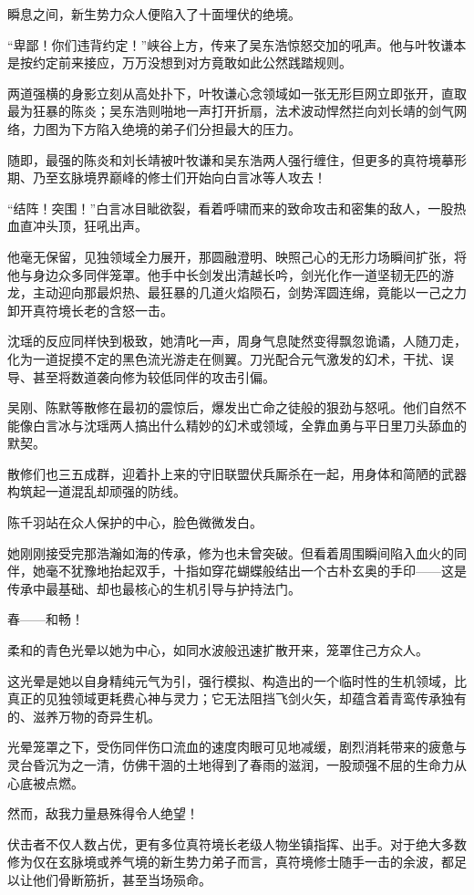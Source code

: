 瞬息之间，新生势力众人便陷入了十面埋伏的绝境。

“卑鄙！你们违背约定！”峡谷上方，传来了吴东浩惊怒交加的吼声。他与叶牧谦本是按约定前来接应，万万没想到对方竟敢如此公然践踏规则。

两道强横的身影立刻从高处扑下，叶牧谦心念领域如一张无形巨网立即张开，直取最为狂暴的陈炎；吴东浩则啪地一声打开折扇，法术波动悍然拦向刘长靖的剑气网络，力图为下方陷入绝境的弟子们分担最大的压力。

随即，最强的陈炎和刘长靖被叶牧谦和吴东浩两人强行缠住，但更多的真符境摹形期、乃至玄脉境界巅峰的修士们开始向白言冰等人攻去！

“结阵！突围！”白言冰目眦欲裂，看着呼啸而来的致命攻击和密集的敌人，一股热血直冲头顶，狂吼出声。

他毫无保留，见独领域全力展开，那圆融澄明、映照己心的无形力场瞬间扩张，将他与身边众多同伴笼罩。他手中长剑发出清越长吟，剑光化作一道坚韧无匹的游龙，主动迎向那最炽热、最狂暴的几道火焰陨石，剑势浑圆连绵，竟能以一己之力卸开真符境长老的含怒一击。

沈瑶的反应同样快到极致，她清叱一声，周身气息陡然变得飘忽诡谲，人随刀走，化为一道捉摸不定的黑色流光游走在侧翼。刀光配合元气激发的幻术，干扰、误导、甚至将数道袭向修为较低同伴的攻击引偏。

吴刚、陈默等散修在最初的震惊后，爆发出亡命之徒般的狠劲与怒吼。他们自然不能像白言冰与沈瑶两人搞出什么精妙的幻术或领域，全靠血勇与平日里刀头舔血的默契。

散修们也三五成群，迎着扑上来的守旧联盟伏兵厮杀在一起，用身体和简陋的武器构筑起一道混乱却顽强的防线。

陈千羽站在众人保护的中心，脸色微微发白。

她刚刚接受完那浩瀚如海的传承，修为也未曾突破。但看着周围瞬间陷入血火的同伴，她毫不犹豫地抬起双手，十指如穿花蝴蝶般结出一个古朴玄奥的手印——这是传承中最基础、却也最核心的生机引导与护持法门。

春——和畅！

柔和的青色光晕以她为中心，如同水波般迅速扩散开来，笼罩住己方众人。

这光晕是她以自身精纯元气为引，强行模拟、构造出的一个临时性的生机领域，比真正的见独领域更耗费心神与灵力；它无法阻挡飞剑火矢，却蕴含着青鸾传承独有的、滋养万物的奇异生机。

光晕笼罩之下，受伤同伴伤口流血的速度肉眼可见地减缓，剧烈消耗带来的疲惫与灵台昏沉为之一清，仿佛干涸的土地得到了春雨的滋润，一股顽强不屈的生命力从心底被点燃。

然而，敌我力量悬殊得令人绝望！

伏击者不仅人数占优，更有多位真符境长老级人物坐镇指挥、出手。对于绝大多数修为仅在玄脉境或养气境的新生势力弟子而言，真符境修士随手一击的余波，都足以让他们骨断筋折，甚至当场殒命。

